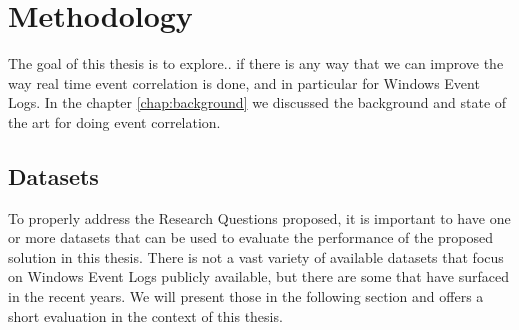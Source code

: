 \chapter{Methodology}
\label{chap:methodology}

The goal of this thesis is to explore.. if there is any way that we can improve the way real time event correlation is done, and in particular for Windows Event Logs.
In the chapter \cref{chap:background} we discussed the background and state of the art for doing event correlation.

\section{Datasets}
\label{sec:datasets}
To properly address the Research Questions proposed, it is important to have one or more datasets that can be used to evaluate the performance of the proposed solution in this thesis.
There is not a vast variety of available datasets that focus on Windows Event Logs publicly available, but there are some that have surfaced in the recent years. We will present those in the following section and offers a short evaluation in the context of this thesis.


